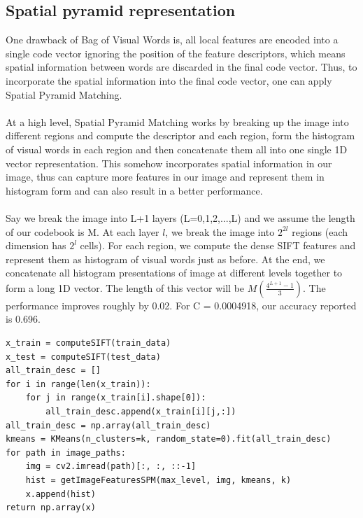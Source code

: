 \subsection*{Spatial pyramid representation}
\vspace{-5pt}
One drawback of Bag of Visual Words is, all local features are encoded into a single code vector ignoring the position of the feature descriptors, which means spatial information between words are discarded in the final code vector. Thus, to incorporate the spatial information into the final code vector, one can apply Spatial Pyramid Matching. \\ \\
At a high level, Spatial Pyramid Matching works by breaking up the image into different regions and compute the descriptor and each region, form the histogram of visual words in each region and then concatenate them all into one single 1D vector representation. This somehow incorporates spatial information in our image, thus can capture more features in our image and represent them in histogram form and can also result in a better performance. \\ \\
Say we break the image into L+1 layers (L=0,1,2,...,L) and we assume the length of our codebook is M. At each layer $l$, we break the image into $2^{2l}$ regions (each dimension has $2^l$ cells). For each region, we compute the dense SIFT features and represent them as histogram of visual words just as before. At the end, we concatenate all histogram presentations of image at different levels together to form a long 1D vector. The length of this vector will be $M(\frac{4^{L+1}-1}{3})$. 
The performance improves roughly by 0.02. For C = 0.0004918, our accuracy reported is 0.696.
\begin{lstlisting}[style=Matlab-editor]
x_train = computeSIFT(train_data)
x_test = computeSIFT(test_data)
all_train_desc = []
for i in range(len(x_train)):
    for j in range(x_train[i].shape[0]):
        all_train_desc.append(x_train[i][j,:])
all_train_desc = np.array(all_train_desc)
kmeans = KMeans(n_clusters=k, random_state=0).fit(all_train_desc)
for path in image_paths:
    img = cv2.imread(path)[:, :, ::-1]
    hist = getImageFeaturesSPM(max_level, img, kmeans, k)
    x.append(hist)
return np.array(x)
\end{lstlisting}
\vspace{-15pt}


